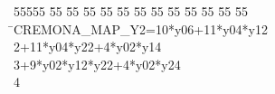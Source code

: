 %
%
\begin{tabbing}
55555 \= 55 \= 55 \= 55 \= 55 \= 55 \= 55 \= 55 \= 55 \= 55 \= 55 \= 55 \= 55 \= \>CREMONA\_MAP\_Y2=10*y06+11*y04*y12\\[0pt]
2\>+11*y04*y22+4*y02*y14\\[0pt]
3\>+9*y02*y12*y22+4*y02*y24\\[0pt]
4\>\end{tabbing}
